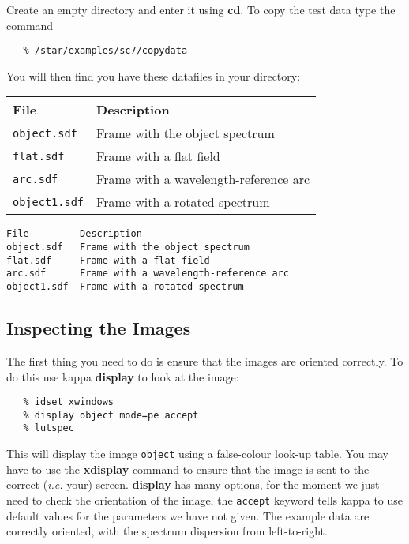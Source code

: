 \documentclass[twoside,11pt]{article}
\newenvironment{latexonly}{}{}
\newcommand{\xref}[3]{#1}
\newcommand{\xlabel}[1]{}
\newcommand{\mlabel}[1]{\xlabel{#1}\label{#1}}
\newcommand{\scspec}[2]{#1}
\newcommand{\scspec}[2]{#2}
\begin{document}
Create an empty directory and enter it using {\bf cd}\@.
To copy the test data type the command

{
\scspec{\small}{ }
\begin{verbatim}
   % /star/examples/sc7/copydata
\end{verbatim}
}

You will then find you have these datafiles in your directory:

\begin{latexonly}
\begin{center}
\begin{tabular}{ll}
File & Description \\ \hline
{\tt object.sdf}  & Frame with the object spectrum\\
{\tt flat.sdf}    & Frame with a flat field\\
{\tt arc.sdf}     & Frame with a wavelength-reference arc\\
{\tt object1.sdf} & Frame with a rotated spectrum\\ \hline
\end{tabular}
\end{center}
\end{latexonly}
\begin{htmlonly}
\begin{verbatim}
File         Description
object.sdf   Frame with the object spectrum
flat.sdf     Frame with a flat field
arc.sdf      Frame with a wavelength-reference arc
object1.sdf  Frame with a rotated spectrum
\end{verbatim}
\end{htmlonly}

\subsection{\mlabel{inspecting_the_images}Inspecting the Images}

The first thing you need to do is ensure that the images are oriented
correctly.  To do this use \xref{{\sc kappa}}{sun95}{} 
\xref{{\bf display}}{sun95}{DISPLAY} to look at the image:

{
\scspec{\small}{ }
\begin{verbatim}
   % idset xwindows
   % display object mode=pe accept
   % lutspec
\end{verbatim}
}

This will display the image \verb+object+ using a false-colour
look-up table.  You may have to use the
\xref{{\bf xdisplay}}{sun129}{}\cite{xdisplay} command to ensure
that the image is sent to the correct ({\it{i.e.}} your) screen.
{\bf display} has many
options, for the moment we just need to check the orientation of the image,
the \verb+accept+ keyword tells {\sc kappa} to use default values for the
parameters we have not given.
The example data are correctly oriented, with the spectrum dispersion
from left-to-right.
\end{document}
